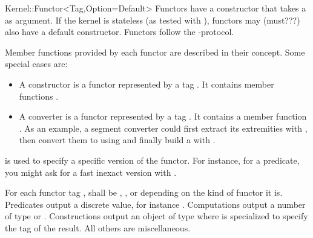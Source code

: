 \begin{ccRefConcept}{Kernel::Functor<Tag,Option=Default>}
Functors have a constructor that takes a  as argument. If the kernel is stateless (as tested with ), functors may (must???) also have a default constructor. Functors follow the -protocol.

Member functions provided by each functor are described in their concept. Some special cases are:
\begin{itemize}
  \item A constructor is a functor represented by a tag . It contains member functions .
  \item A converter is a functor represented by a tag . It contains a member function . As an example, a segment converter could first extract its extremities with , then convert them to  using  and finally build a  with .
\end{itemize}

 is used to specify a specific version of the functor. For instance, for a predicate, you might ask for a fast inexact version with .

For each functor tag ,  shall be
, ,  or 
depending on the kind of functor it is. Predicates output a discrete value, for instance . Computations output a number of type  or . Constructions output an object of type  where  is specialized to specify the tag of the result. All others are miscellaneous.


\end{ccRefConcept}

